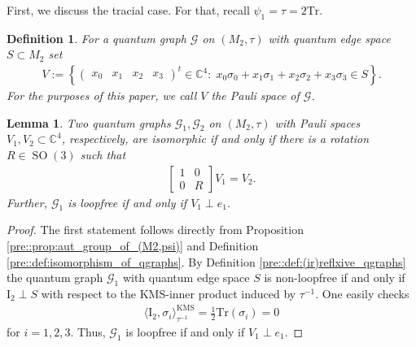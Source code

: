 \documentclass{amsart}
\newtheorem{definition}[thm]{Definition}
\newtheorem{lemma}[thm]{Lemma}
\newcommand{\Tr}{\mathrm{Tr}}
\newcommand{\C}{\mathbb{C}}
\DeclareMathOperator{\SO}{SO}
\DeclareMathOperator{\KMS}{KMS}
\begin{document}
First, we discuss the tracial case. For that,  recall $\psi_1 = \tau = 2 \mathrm{Tr}$.

\begin{definition}
    \label{pau::def:pauli_space_of_qgraph}
    For a quantum graph $\mathcal{G}$ on $(M_2, \tau)$ with quantum edge space $S \subset M_2$ set
    \begin{align*}
        V := \left\{\begin{pmatrix}
            x_0 & x_1 & x_2 & x_3
        \end{pmatrix}^t \in \C^4: \; x_0 \sigma_0 + x_1 \sigma_1 +  x_2 \sigma_2 + x_3 \sigma_3 \in S \right\}.
    \end{align*}
    For the purposes of this paper, we call $V$ the \emph{Pauli space} of $\mathcal{G}$.
\end{definition}


\begin{lemma}
\label{pau::lemma:Pauli_spaces_of_isomorphic_quantum_graphs}
    Two quantum graphs $\mathcal{G}_1, \mathcal{G}_2$ on $(M_2, \tau)$ with Pauli spaces $V_1, V_2 \subset \C^4$, respectively, are isomorphic if and only if there is a rotation $R \in \SO(3)$ such that
    \begin{align*}
        \left[\begin{array}{c|c}
            1& 0 \\
            \hline
            0 & R 
            \end{array}\right] V_1 = V_2.
    \end{align*}
    Further, $\mathcal{G}_1$ is loopfree if and only if $V_1 \perp e_1$.
\end{lemma}

\begin{proof}
    The first statement follows directly from Proposition \ref{pre::prop:aut_group_of_(M2,psi)} and Definition \ref{pre::def:isomorphism_of_qgraphs}.
    By Definition \ref{pre::def:(ir)reflxive_qgraphs} the quantum graph $\mathcal{G}_1$ with quantum edge space $S$ is non-loopfree if and only if $\mathrm{I}_2\perp S$ with respect to the KMS-inner product induced by $\tau^{-1}$. One easily checks
    \begin{align*}
        \langle \mathrm{I}_2,\sigma_i\rangle_{\tau^{-1}}^{\KMS}
        =\frac{1}{2}\Tr\left(
        \sigma_i
        \right)=0
    \end{align*}
    for $i=1,2,3$.
    Thus, $\mathcal{G}_1$ is loopfree if and only if $V_1\perp e_1$.
\end{proof}
\end{document}
